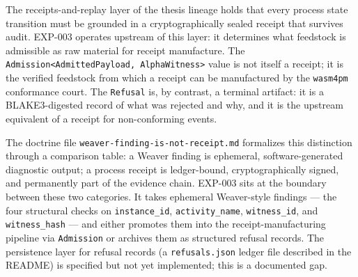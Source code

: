 The receipts-and-replay layer of the thesis lineage holds that every process state
transition must be grounded in a cryptographically sealed receipt that survives audit.
EXP-003 operates upstream of this layer: it determines what feedstock is admissible
as raw material for receipt manufacture. The \texttt{Admission<AdmittedPayload, AlphaWitness>}
value is not itself a receipt; it is the verified feedstock from which a receipt can
be manufactured by the \texttt{wasm4pm} conformance court. The \texttt{Refusal} is,
by contrast, a terminal artifact: it is a BLAKE3-digested record of what was rejected
and why, and it is the upstream equivalent of a receipt for non-conforming events.

The doctrine file \texttt{weaver-finding-is-not-receipt.md} formalizes this distinction
through a comparison table: a Weaver finding is ephemeral, software-generated diagnostic
output; a process receipt is ledger-bound, cryptographically signed, and permanently
part of the evidence chain. EXP-003 sits at the boundary between these two categories.
It takes ephemeral Weaver-style findings --- the four structural checks on
\texttt{instance\_id}, \texttt{activity\_name}, \texttt{witness\_id}, and
\texttt{witness\_hash} --- and either promotes them into the receipt-manufacturing
pipeline via \texttt{Admission} or archives them as structured refusal records. The
persistence layer for refusal records (a \texttt{refusals.json} ledger file described
in the README) is specified but not yet implemented; this is a documented gap.
